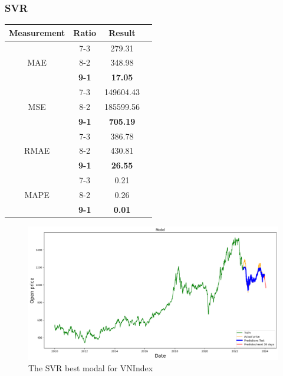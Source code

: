 \documentclass{ieeeojies}
\begin{document}
\subsubsection{SVR}
\begin{table}[H]
    \centering
    \begin{tabular}{|c|c|c|c|}
        \hline
         Measurement & Ratio &  Result  \\
        \hline
             & 7-3 & 279.31 \\
        MAE  & 8-2 & 348.98  \\
            & \textbf{9-1} & \textbf{17.05} \\
        \hline
           & 7-3 & 149604.43  \\
        MSE  & 8-2 & 185599.56 \\
            & \textbf{9-1} & \textbf{705.19}  \\
        \hline
           & 7-3 & 386.78 \\
        RMAE  & 8-2 & 430.81  \\
            & \textbf{9-1} &\textbf{ 26.55} \\
        \hline
           & 7-3 & 0.21  \\
        MAPE  & 8-2 & 0.26  \\
            & \textbf{9-1} & \textbf{0.01} \\
        \hline
    \end{tabular}
    \label{table:example}
\end{table}
\begin{figure}[H]
    \centering
    \includegraphics[width=0.8\linewidth]{SVR VN 91.jpg}
    \caption{The SVR best modal for VNIndex}
    \label{fig:example}
\end{figure}
\end{document}
